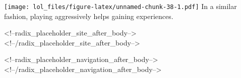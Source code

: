 \documentclass[
]{article}
\begin{document}
\texttt{[image: lol\_files/figure-latex/unnamed-chunk-38-1.pdf]} In a
similar fashion, playing aggressively helps gaining experiences.

<!--radix_placeholder_site_after_body-->
<!--/radix_placeholder_site_after_body-->

<!--radix_placeholder_navigation_after_body-->
<!--/radix_placeholder_navigation_after_body-->
\end{document}
